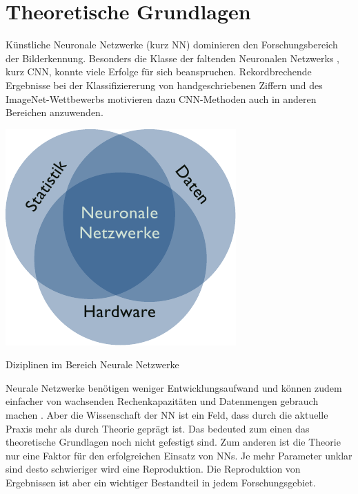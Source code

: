 \chapter{Theoretische Grundlagen}
Künstliche Neuronale Netzwerke (kurz NN) dominieren den Forschungsbereich der 
Bilderkennung. 
Besonders die Klasse der faltenden Neuronalen Netzwerks , kurz CNN, konnte viele Erfolge für sich beanspruchen.
Rekordbrechende Ergebnisse bei der Klassifiziererung von handgeschriebenen Ziffern \parencite{LeCunBackpropagationappliedhandwritten1989} und des ImageNet-Wettbewerbs \parencite{KrizhevskyImageNetClassificationDeep2012} motivieren dazu CNN-Methoden auch in anderen
Bereichen anzuwenden.

\begin{marginfigure}
    \includegraphics[width=\textwidth]{figures/tasks/nn_areas_venn.pdf}
    \caption{Diziplinen im Bereich Neurale Netzwerke}
    \label{fig:chen:cnn_task}
\end{marginfigure}
Neurale Netzwerke benötigen weniger Entwicklungsaufwand und können zudem einfacher von 
 wachsenden Rechenkapazitäten und Datenmengen gebrauch machen \parencite[436]{LeCunDeeplearning2015}. 
Aber die Wissenschaft der NN ist ein Feld, dass durch die aktuelle Praxis mehr als durch Theorie geprägt ist. 
Das bedeuted zum einen das theoretische Grundlagen noch nicht gefestigt sind.
Zum anderen ist die Theorie nur eine Faktor für den erfolgreichen Einsatz von NNs. 
Je mehr Parameter unklar sind desto schwieriger wird eine Reproduktion.
Die Reproduktion von Ergebnissen ist aber ein wichtiger Bestandteil in jedem Forschungsgebiet. 

